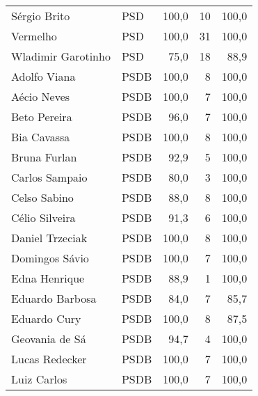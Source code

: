 \begin{longtable}{llrrr}
                        Sérgio Brito &            PSD &     100,0 &           10 &      100,0 \\
                            Vermelho &            PSD &     100,0 &           31 &      100,0 \\
                  Wladimir Garotinho &            PSD &      75,0 &           18 &       88,9 \\
                        Adolfo Viana &           PSDB &     100,0 &            8 &      100,0 \\
                         Aécio Neves &           PSDB &     100,0 &            7 &      100,0 \\
                        Beto Pereira &           PSDB &      96,0 &            7 &      100,0 \\
                         Bia Cavassa &           PSDB &     100,0 &            8 &      100,0 \\
                        Bruna Furlan &           PSDB &      92,9 &            5 &      100,0 \\
                      Carlos Sampaio &           PSDB &      80,0 &            3 &      100,0 \\
                        Celso Sabino &           PSDB &      88,0 &            8 &      100,0 \\
                      Célio Silveira &           PSDB &      91,3 &            6 &      100,0 \\
                     Daniel Trzeciak &           PSDB &     100,0 &            8 &      100,0 \\
                      Domingos Sávio &           PSDB &     100,0 &            7 &      100,0 \\
                       Edna Henrique &           PSDB &      88,9 &            1 &      100,0 \\
                     Eduardo Barbosa &           PSDB &      84,0 &            7 &       85,7 \\
                        Eduardo Cury &           PSDB &     100,0 &            8 &       87,5 \\
                      Geovania de Sá &           PSDB &      94,7 &            4 &      100,0 \\
                      Lucas Redecker &           PSDB &     100,0 &            7 &      100,0 \\
                         Luiz Carlos &           PSDB &     100,0 &            7 &      100,0 \\

\end{longtable}
